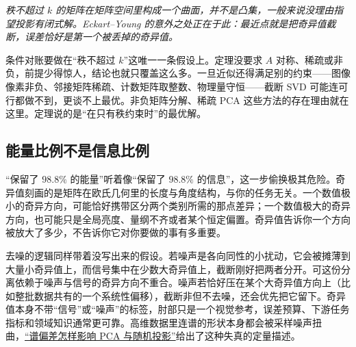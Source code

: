 \begin{center}

\emph{秩不超过 \(k\) 的矩阵在矩阵空间里构成一个曲面，并不是凸集，一般来说没理由指望投影有闭式解。Eckart--Young 的意外之处正在于此：最近点就是把奇异值截断，误差恰好是第一个被丢掉的奇异值。}
\end{center}

条件对账要做在``秩不超过 \(k\)''这唯一一条假设上。定理没要求 \(A\) 对称、稀疏或非负，前提少得惊人，结论也就只覆盖这么多。一旦近似还得满足别的约束——图像像素非负、邻接矩阵稀疏、计数矩阵取整数、物理量守恒——截断 SVD 可能连可行都做不到，更谈不上最优。非负矩阵分解、稀疏 PCA 这些方法的存在理由就在这里。定理说的是``在只有秩约束时''的最优解。

\subsection{能量比例不是信息比例}

``保留了 \(98.8\%\) 的能量''听着像``保留了 \(98.8\%\) 的信息''，这一步偷换极其危险。奇异值刻画的是矩阵在欧氏几何里的长度与角度结构，与你的任务无关。一个数值极小的奇异方向，可能恰好携带区分两个类别所需的那点差异；一个数值极大的奇异方向，也可能只是全局亮度、量纲不齐或者某个恒定偏置。奇异值告诉你一个方向被放大了多少，不告诉你它对你要做的事有多重要。

去噪的逻辑同样带着没写出来的假设。若噪声是各向同性的小扰动，它会被摊薄到大量小奇异值上，而信号集中在少数大奇异值上，截断刚好把两者分开。可这份分离依赖于噪声与信号的奇异方向不重合。噪声若恰好压在某个大奇异值方向上（比如整批数据共有的一个系统性偏移），截断非但不去噪，还会优先把它留下。奇异值本身不带``信号''或``噪声''的标签，肘部只是一个视觉参考，误差预算、下游任务指标和领域知识通常更可靠。高维数据里连谱的形状本身都会被采样噪声扭曲，\hyperref[sec:11-Mathematical-Statistics/09-Random-Matrix-Theory/03]{``谱偏差怎样影响 PCA 与随机投影''}给出了这种失真的定量描述。

